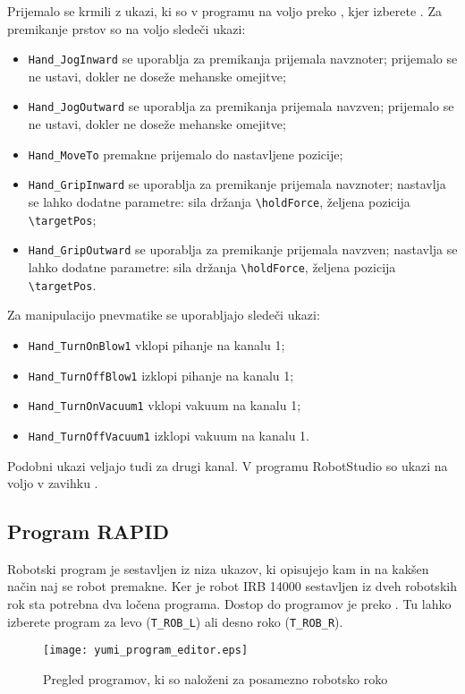 Prijemalo se krmili z ukazi, ki so v programu na voljo preko , kjer izberete . Za premikanje prstov so na voljo sledeči ukazi:
\begin{itemize}
  \item \verb"Hand_JogInward" se uporablja za premikanja prijemala navznoter; prijemalo se ne ustavi, dokler ne doseže mehanske omejitve;
  \item \verb"Hand_JogOutward" se uporablja za premikanja prijemala navzven; prijemalo se ne ustavi, dokler ne doseže mehanske omejitve;
  \item \verb"Hand_MoveTo" premakne prijemalo do nastavljene pozicije;
  \item \verb"Hand_GripInward" se uporablja za premikanje prijemala navznoter; nastavlja se lahko dodatne parametre: sila držanja \verb"\holdForce", željena pozicija \verb"\targetPos";
  \item \verb"Hand_GripOutward" se uporablja za premikanje prijemala navzven; nastavlja se lahko dodatne parametre: sila držanja \verb"\holdForce", željena pozicija \verb"\targetPos".
\end{itemize}
Za manipulacijo pnevmatike se uporabljajo sledeči ukazi:
\begin{itemize}
  \item \verb"Hand_TurnOnBlow1" vklopi pihanje na kanalu 1;
  \item \verb"Hand_TurnOffBlow1" izklopi pihanje na kanalu 1;
  \item \verb"Hand_TurnOnVacuum1" vklopi vakuum na kanalu 1;
  \item \verb"Hand_TurnOffVacuum1" izklopi vakuum na kanalu 1.
\end{itemize}
Podobni ukazi veljajo tudi za drugi kanal. V programu RobotStudio so ukazi na voljo v zavihku .

\subsection{Program RAPID}

Robotski program je sestavljen iz niza ukazov, ki opisujejo kam in na kakšen način naj se robot premakne. Ker je robot IRB 14000 sestavljen iz dveh robotskih rok sta potrebna dva ločena programa. Dostop do programov je preko . Tu lahko izberete program za levo (\verb"T_ROB_L") ali desno roko (\verb"T_ROB_R").

\begin{figure}[!hbt]
\centering
\texttt{[image: yumi\_program\_editor.eps]}
\caption{Pregled programov, ki so naloženi za posamezno robotsko roko}
\label{fig:yumi_program_editor}
\end{figure}

